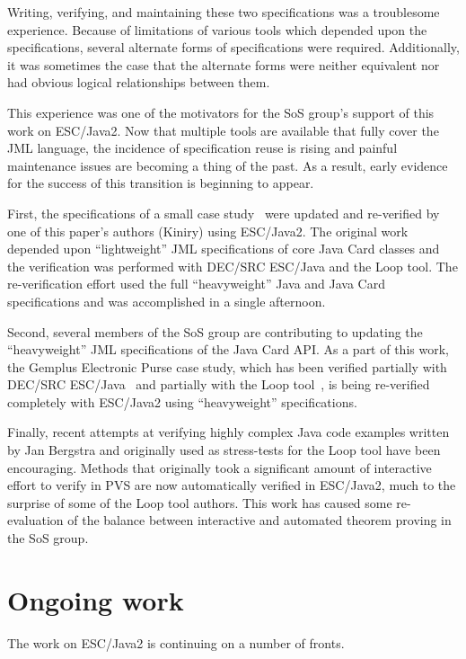 \documentclass{article}
\begin{document}
Writing, verifying, and maintaining these two specifications was a
troublesome experience.  Because of limitations of various tools which
depended upon the specifications, several alternate forms of
specifications were required.  Additionally, it was sometimes the case
that the alternate forms were neither equivalent nor had obvious
logical relationships between them.

This experience was one of the motivators for the SoS group's support
of this work on ESC/Java2.  Now that multiple tools are available that
fully cover the JML language, the incidence of specification reuse is
rising and painful maintenance issues are becoming a thing of the
past.  As a result, early evidence for the success of this transition is
beginning to appear.

First, the specifications of a small case
study~\cite{BreunesseJacobsBerg02} were updated and re-verified by one
of this paper's authors (Kiniry) using ESC/Java2.  The original work
depended upon ``light\-weight'' JML specifications of core Java Card classes
and the verification was performed with DEC/SRC ESC/Java and the Loop
tool.  The re-verification effort used the full ``heavyweight'' Java
and Java Card specifications and was accomplished in a single
afternoon.

Second, several members of the SoS group are contributing to updating
the ``heavyweight'' JML specifications of the Java Card API.  As a
part of this work, the Gemplus Electronic Purse case study, which has
been verified partially with DEC/SRC ESC/Java~\cite{CatanoHuisman02}
and partially with the Loop tool~\cite{BreunesseJacobsBerg02}, is being
re-verified completely with ESC/Java2 using ``heavyweight''
specifications.

Finally, recent attempts at verifying highly complex Java code
examples written by Jan Bergstra and originally used as stress-tests
for the Loop tool have been encouraging.  Methods that originally took
a significant amount of interactive effort to verify in PVS are now
automatically verified in ESC/Java2, much to the surprise of some of
the Loop tool authors.  This work has caused some re-evaluation of the
balance between interactive and automated theorem proving in the SoS
group.

\section{Ongoing work}
The work on ESC/Java2 is continuing on a number of fronts.
\end{document}
